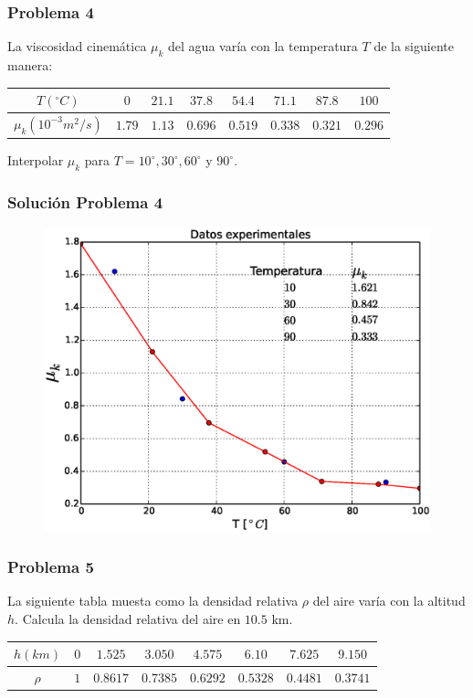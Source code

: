 \begin{frame}
\frametitle{Problema 4}
La viscosidad cinemática $\mu_{k}$ del agua varía con la temperatura $T$ de la siguiente manera:
	\begin{table}[H]
		\centering
		\fontsize{12}{12}\selectfont
				\begin{tabulary}{15cm}{c | c | c | c | c | c | c | c }
					$T(^\circ C)$ & $0$ & $21.1$ & $37.8$ & $54.4$ & $71.1$ & $87.8$ & $100$ \\
					\midrule
					$\mu_{k} (10^{-3}m^{2}/s)$ & $1.79$ & $1.13$ & $0.696$ & $0.519$ & $0.338$ & $0.321$ & $0.296$ 
				\end{tabulary}
	\end{table}
	Interpolar $\mu_{k}$ para $T= 10^{\circ},30^{\circ},60^{\circ}$ y $90^{\circ}$.
\end{frame}
\begin{frame}
\frametitle{Solución Problema 4}
\begin{figure}
	\centering
	\includegraphics[scale=0.5]{Imagenes/Problema4_01.eps} 
\end{figure}
\end{frame}
\begin{frame}
\frametitle{Problema 5}
La siguiente tabla muesta como la densidad relativa $\rho$ del aire varía con la altitud $h$. Calcula la densidad relativa del aire en $10.5$ km.
	\begin{table}[H]
		\centering 
		\fontsize{12}{12}\selectfont
			\begin{tabulary}{15cm}{c | c | c | c | c | c | c | c }
				$h(km)$ & $0$ & $1.525$ & $3.050$ & $4.575$ & $6.10$ & $7.625$ & $9.150$ \\
				\midrule
				$\rho$ & $1$ & $0.8617$ & $0.7385$ & $0.6292$ & $0.5328$ & $0.4481$ & $0.3741$ 
			\end{tabulary}
	\end{table}
\end{frame}
